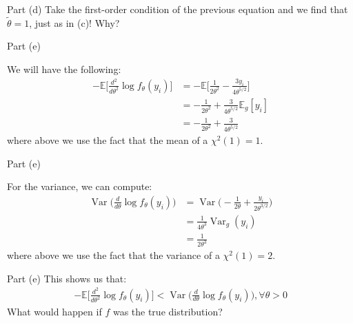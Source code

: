\begin{frame}{Part (d)}
    Take the first-order condition of the previous equation and we find that $\tilde{\theta} = 1$, just as in (c)! Why?
\end{frame}

\begin{frame}{Part (e)}

    We will have the following:
    \begin{align*}
        - \mathbb{E}\Biggr[ \frac{d^2}{d\theta^2}\log f_\theta(y_i) \Biggr] &= - \mathbb{E} \Biggr[ \frac{1}{2 \theta^2} - \frac{3 y_i}{4 \theta^{5/2}}\Biggr]
        \\
        &= - \frac{1}{2 \theta^2} + \frac{3}{4 \theta^{5/2}} \mathbb{E}_{g}[ y_i]
        \\
        &= - \frac{1}{2 \theta^2} + \frac{3}{4 \theta^{5/2}}
    \end{align*}
    where above we use the fact that the mean of a $\chi^2(1) = 1$.

\end{frame}

\begin{frame}{Part (e)}

    For the variance, we can compute:
    \begin{align*}
        \operatorname{Var}\Biggr( \frac{d}{d\theta} \log f_\theta(y_i) \Biggr) &= \operatorname{Var}\Biggr( - \frac{1}{2 \theta} + \frac{y_i}{2 \theta^{3/2}}\Biggr)
        \\
        &= \frac{1}{4 \theta^3} \operatorname{Var}_{g}(y_i)
        \\
        &= \frac{1}{2 \theta^3}
    \end{align*}
    where above we use the fact that the variance of a $\chi^2(1) = 2$.

\end{frame}

\begin{frame}{Part (e)}
    This shows us that:
    \begin{align*}
        - \mathbb{E}\Biggr[ \frac{d^2}{d\theta^2}\log f_\theta(y_i) \Biggr] < \operatorname{Var}\Biggr( \frac{d}{d\theta} \log f_\theta(y_i) \Biggr), \forall \theta > 0
    \end{align*}
    What would happen if $f$ was the true distribution?
    
\end{frame}